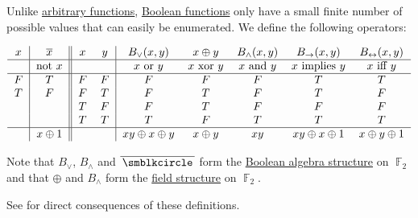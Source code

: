 \begin{definition}\label{def:standard_boolean_operators}
  Unlike \hyperref[def:function/single_valued]{arbitrary functions}, \hyperref[def:boolean_function]{Boolean functions} only have a small finite number of possible values that can easily be enumerated. We define the following operators:

  \begin{equation*}
    \begin{tabular}{c | c || c c | c c c c c c}
      \( x \) & \( \overline{x} \) & \( x \) & \( y \) & \( B_\vee(x, y) \) & \( x \oplus y \)    & \( B_\wedge(x, y) \) & \( B_\rightarrow(x, y) \)   & \( B_\leftrightarrow(x, y) \) \\
      \hline
              & not \( x \)        &         &         & \( x \) or \( y \)  & \( x \) xor \( y \) & \( x \) and \( y \)     & \( x \) implies \( y \) & \( x \) iff \( y \)       \\
      \hline
      \( F \) & \( T \)            & \( F \) & \( F \) & \( F \)             & \( F \)             & \( F \)                 & \( T \)                 & \( T \)                   \\
      \( T \) & \( F \)            & \( F \) & \( T \) & \( F \)             & \( T \)             & \( F \)                 & \( T \)                 & \( F \)                   \\
              &                    & \( T \) & \( F \) & \( F \)             & \( T \)             & \( F \)                 & \( F \)                 & \( F \)                   \\
              &                    & \( T \) & \( T \) & \( T \)             & \( F \)             & \( T \)                 & \( T \)                 & \( T \)                   \\
      \hline
              & \( x \oplus 1 \) &         &         & \( xy \oplus x \oplus y \) & \( x \oplus y \)    & \( xy \)            & \( xy \oplus x \oplus 1 \) & \( x \oplus y \oplus 1 \)
    \end{tabular}
  \end{equation*}

  Note that \( B_\vee \), \( B_\wedge \) and \( \overline{\placeholder} \) form the \hyperref[thm:f2_is_boolean_algebra]{Boolean algebra structure} on \( \BbbF_2 \) and that \( \oplus \) and \( B_\wedge \) form the \hyperref[def:field]{field structure} on \( \BbbF_2 \).

  See  for direct consequences of these definitions.
\end{definition}

